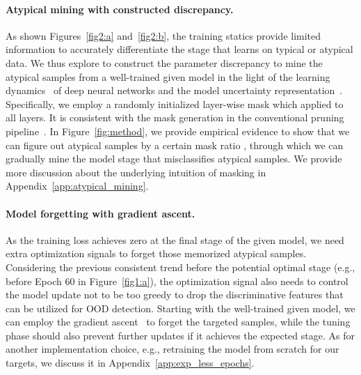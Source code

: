 \documentclass{article}
\theoremstyle{plain}
\theoremstyle{definition}
\theoremstyle{remark}
\begin{document}
\paragraph{Atypical mining with constructed discrepancy.}  
As shown Figures~\ref{fig2:a} and~\ref{fig2:b}, the training statics provide limited information to accurately differentiate the stage that learns on typical or atypical data. We thus explore to construct the parameter discrepancy to mine the atypical samples from a well-trained given model in the light of the learning dynamics~\citep{goodfellow2016deep, arpit2017closer} of deep neural networks and the model uncertainty representation~\citep{gal2016dropout}. Specifically, we employ a randomly initialized layer-wise mask which applied to all layers. It is consistent with the mask generation in the conventional pruning pipeline~\citep{han2015deep}. In Figure~\ref{fig:method}, we provide empirical evidence to show that we can figure out atypical samples by a certain mask ratio , through which we can gradually mine the model stage that misclassifies atypical samples. We provide more discussion about the underlying intuition of masking in Appendix~\ref{app:atypical_mining}.

\paragraph{Model forgetting with gradient ascent.}
As the training loss achieves zero at the final stage of the given model, we need extra optimization signals to forget those memorized atypical samples. Considering the previous consistent trend before the potential optimal stage (e.g., before Epoch 60 in Figure~\ref{fig1:a}), the optimization signal also needs to control the model update not to be too greedy to drop the discriminative features that can be utilized for OOD detection. Starting with the well-trained given model, we can employ the gradient ascent~\citep{sorg2010reward, ishida2020we} to forget the targeted samples, while the tuning phase should also prevent further updates if it achieves the expected stage. As for another implementation choice, e.g., retraining the model from scratch for our targets, we discuss it in Appendix~\ref{app:exp_less_epochs}.
\end{document}
